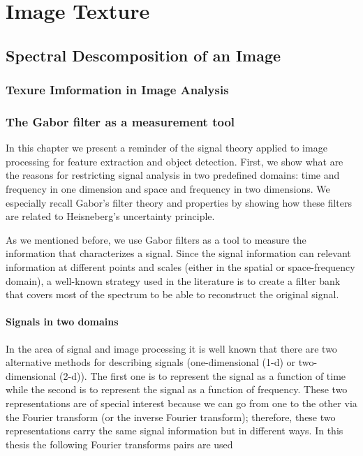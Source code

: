 \part{Image Texture}
\chapter{Spectral Descomposition of an Image}
\section{Texure Imformation in Image Analysis}

\section{The Gabor filter as a measurement tool}\label{ch:gabor_filter_description}

In this chapter we present a reminder of the signal theory applied to image processing for feature extraction and object detection. First, we show what are the reasons for restricting signal analysis in two predefined domains: time and frequency in one dimension and space and frequency in two dimensions. We especially recall Gabor's filter theory and properties by showing how these filters are related to Heisneberg's uncertainty principle.

As we mentioned before, we use Gabor filters as a tool to measure the information that characterizes a signal. Since the signal information can relevant information at different points and scales (either in the spatial or space-frequency domain), a well-known strategy used in the literature is to create a filter bank that covers most of the spectrum to be able to reconstruct the original signal.

\subsection{Signals in two domains}

In the area of signal and image processing it is well known that there are two alternative methods for describing signals (one-dimensional (1-d) or two-dimensional (2-d)). The first one is to represent the signal as a function of time while the second is to represent the signal as a function of frequency. These two representations are of special interest because we can go from one to the other via the Fourier transform (or the inverse Fourier transform); therefore, these two representations carry the same signal information but in different ways. In this thesis the following Fourier transforms pairs are used

